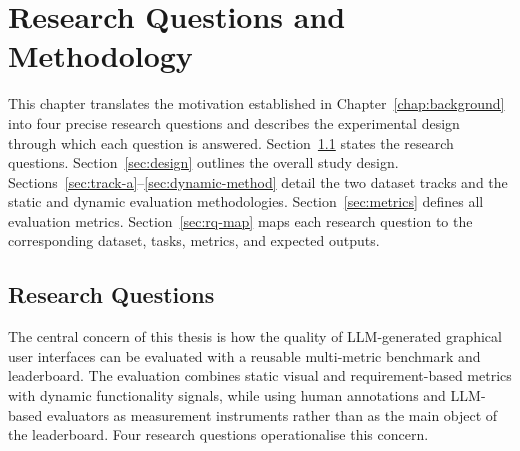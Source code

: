 %

\chapter{Research Questions and Methodology}
\label{chap:methodology}

This chapter translates the motivation established in Chapter~\ref{chap:background}
into four precise research questions and describes the experimental design
through which each question is answered.
Section~\ref{sec:rqs} states the research questions.
Section~\ref{sec:design} outlines the overall study design.
Sections~\ref{sec:track-a}--\ref{sec:dynamic-method} detail the
two dataset tracks and the static and dynamic evaluation methodologies.
Section~\ref{sec:metrics} defines all evaluation metrics.
Section~\ref{sec:rq-map} maps each research question to the corresponding
dataset, tasks, metrics, and expected outputs.

\section{Research Questions}
\label{sec:rqs}

The central concern of this thesis is how the quality of LLM-generated
graphical user interfaces can be evaluated with a reusable multi-metric
benchmark and leaderboard. The evaluation combines static visual and
requirement-based metrics with dynamic functionality signals, while using
human annotations and LLM-based evaluators as measurement instruments rather
than as the main object of the leaderboard. Four research questions
operationalise this concern.

